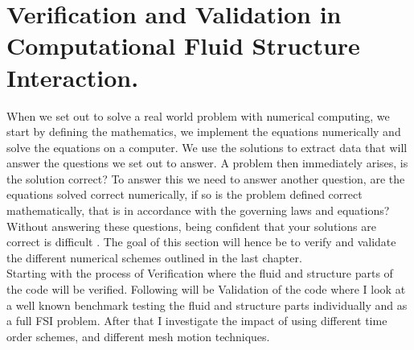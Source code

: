 \chapter{Verification and Validation in Computational Fluid Structure Interaction. }
When we set out to solve a real world problem with numerical computing, we start by defining the mathematics, we implement the equations numerically and solve the equations on a computer. We use the solutions to extract data that will answer the questions we set out to answer. A problem then immediately arises, is the solution correct? To answer this we need to answer another question, are the equations solved correct numerically, if so is the problem defined correct mathematically, that is in accordance with the governing laws and equations?
Without answering these questions, being confident that your solutions are correct is difficult \cite{Selin2014}. The goal of this section will hence be to verify and validate the different numerical schemes outlined in the last chapter.  \\

Starting with the process of Verification where the fluid and structure parts of the code will be verified. Following will be Validation of the code where I look at a well known benchmark testing the fluid and structure parts individually and as a full FSI problem. After that I investigate the impact of using different time order schemes, and different mesh motion techniques.\newline

\begin{comment}
We start with Verification, which is the process of assessing numerical correctness and accuracy of a computed solution. Then comes Validation, which is assessing physical accuracy of the numerical model, a process which is done by comparing numerical simulation with experimental data. In simple terms we check that we are solving the equations right and then that we are solving the right equations. The process of Verification has to always come before Validation. Because there is no need in checking if we are using the right equations if the equations are not solved right. 
\end{comment}

